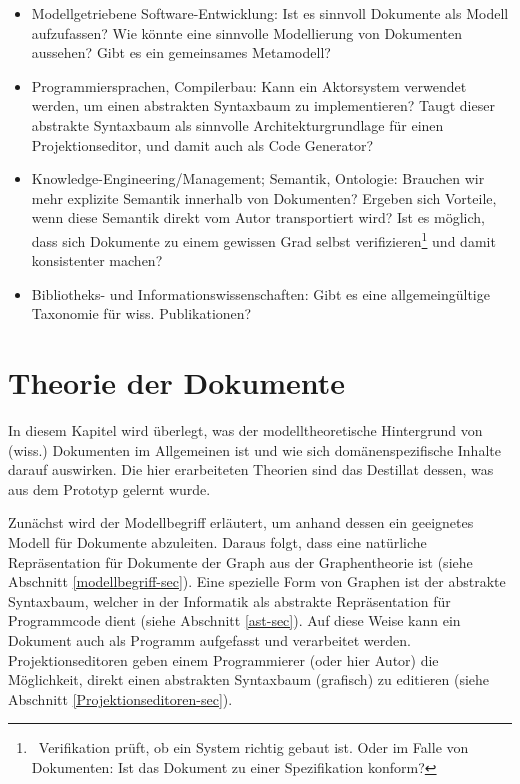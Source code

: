  
\begin{itemize}

\item
Modellgetriebene Software-Entwicklung: Ist es sinnvoll Dokumente als Modell aufzufassen? Wie könnte eine sinnvolle Modellierung von Dokumenten aussehen? Gibt es ein gemeinsames Metamodell?


\item
Programmiersprachen, Compilerbau: Kann ein Aktorsystem verwendet werden, um einen abstrakten Syntaxbaum zu implementieren? Taugt dieser abstrakte Syntaxbaum als sinnvolle Architekturgrundlage für einen Projektionseditor, und damit auch als Code Generator?


\item
Knowledge-Engineering/Management; Semantik, Ontologie: Brauchen wir mehr explizite Semantik innerhalb von Dokumenten? Ergeben sich Vorteile, wenn diese Semantik direkt vom Autor transportiert wird? Ist es möglich, dass sich Dokumente zu einem gewissen Grad selbst verifizieren\footnote{~Verifikation prüft, ob ein System richtig gebaut ist. Oder im Falle von Dokumenten: Ist das Dokument zu einer Spezifikation konform?} und damit konsistenter machen?


\item
Bibliotheks- und Informationswissenschaften: Gibt es eine allgemeingültige Taxonomie für wiss. Publikationen?


\end{itemize}
 
\chapter{Theorie der Dokumente}\label{}
 
In diesem Kapitel wird überlegt, was der modelltheoretische Hintergrund von (wiss.) Dokumenten im Allgemeinen ist und wie sich domänenspezifische Inhalte darauf auswirken. Die hier erarbeiteten Theorien sind das Destillat dessen, was aus dem Prototyp gelernt wurde.

 
Zunächst wird der Modellbegriff erläutert, um anhand dessen ein geeignetes Modell für Dokumente abzuleiten. Daraus folgt, dass eine natürliche Repräsentation für Dokumente der Graph aus der Graphentheorie ist (siehe Abschnitt \ref{modellbegriff-sec}). Eine spezielle Form von Graphen ist der abstrakte Syntaxbaum, welcher in der Informatik als abstrakte Repräsentation für Programmcode dient (siehe Abschnitt \ref{ast-sec}). Auf diese Weise kann ein Dokument auch als Programm aufgefasst und verarbeitet werden. Projektionseditoren geben einem Programmierer (oder hier Autor) die Möglichkeit, direkt einen abstrakten Syntaxbaum (grafisch) zu editieren (siehe Abschnitt \ref{Projektionseditoren-sec}).

